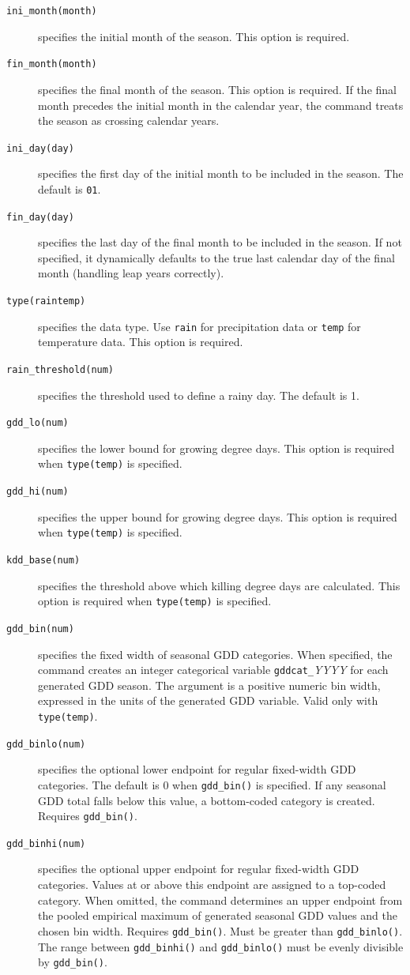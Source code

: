 \begin{description}
	\item[\texttt{ini\_month(month)}] specifies the initial month of the season. This option is required.
	\item[\texttt{fin\_month(month)}] specifies the final month of the season. This option is required. If the final month precedes the initial month in the calendar year, the command treats the season as crossing calendar years.
	\item[\texttt{ini\_day(day)}] specifies the first day of the initial month to be included in the season. The default is \texttt{01}.
	\item[\texttt{fin\_day(day)}] specifies the last day of the final month to be included in the season. If not specified, it dynamically defaults to the true last calendar day of the final month (handling leap years correctly).
	\item[\texttt{type(rain\textbar temp)}] specifies the data type. Use \texttt{rain} for precipitation data or \texttt{temp} for temperature data. This option is required.
	\item[\texttt{rain\_threshold(num)}] specifies the threshold used to define a rainy day. The default is 1.
	\item[\texttt{gdd\_lo(num)}] specifies the lower bound for growing degree days. This option is required when \texttt{type(temp)} is specified.
	\item[\texttt{gdd\_hi(num)}] specifies the upper bound for growing degree days. This option is required when \texttt{type(temp)} is specified.
	\item[\texttt{kdd\_base(num)}] specifies the threshold above which killing degree days are calculated. This option is required when \texttt{type(temp)} is specified.
	\item[\texttt{gdd\_bin(num)}] specifies the fixed width of seasonal GDD categories. When specified, the command creates an integer categorical variable \texttt{gddcat\_}\textit{YYYY} for each generated GDD season. The argument is a positive numeric bin width, expressed in the units of the generated GDD variable. Valid only with \texttt{type(temp)}.
	\item[\texttt{gdd\_binlo(num)}] specifies the optional lower endpoint for regular fixed-width GDD categories. The default is 0 when \texttt{gdd\_bin()} is specified. If any seasonal GDD total falls below this value, a bottom-coded category is created. Requires \texttt{gdd\_bin()}.
	\item[\texttt{gdd\_binhi(num)}] specifies the optional upper endpoint for regular fixed-width GDD categories. Values at or above this endpoint are assigned to a top-coded category. When omitted, the command determines an upper endpoint from the pooled empirical maximum of generated seasonal GDD values and the chosen bin width. Requires \texttt{gdd\_bin()}. Must be greater than \texttt{gdd\_binlo()}. The range between \texttt{gdd\_binhi()} and \texttt{gdd\_binlo()} must be evenly divisible by \texttt{gdd\_bin()}.

\end{description}
